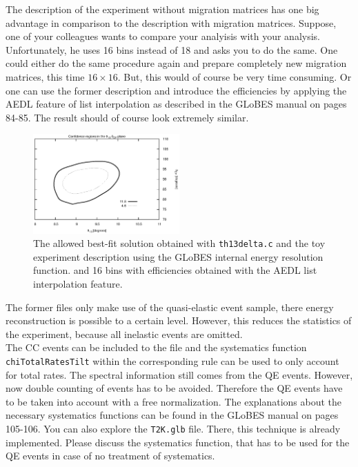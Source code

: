 \documentclass[12pt,a4paper]{article}
\newcommand{\aufg}[2]{\vspace{4mm}{\bf\underline{Problem #1:} {#2}} \vspace{3mm}}
\theoremstyle{dotless}
\begin{document}
The description of the experiment without migration matrices has one big advantage
in comparison to the description with migration matrices. Suppose, one of your colleagues
wants to compare your analyisis with your analysis. Unfortunately, he uses 16 bins instead of
18 and asks you to do the same. One could either do the same procedure again and prepare
completely new migration matrices, this time $16\times16$. But, this would of course be very
time consuming. Or one can use the former description and introduce the efficiencies 
by applying the AEDL feature of list interpolation as described in the GLoBES manual 
on pages 84-85. The result should of course look extremely similar.
%
\begin{figure}[h!]
  \begin{center}
    \includegraphics[width=0.5\textwidth]{Bins.eps}   
      \end{center}
  \vspace{-0.7 cm}
  \caption{\small The allowed best-fit solution obtained with {\tt th13delta.c}
  and the toy experiment description using the GLoBES internal energy resolution function.
  and 16 bins with efficiencies obtained with the AEDL list interpolation feature.}
  \label{fig:Bins}
\end{figure}


\aufg{6}{Usage of Total Rates}

The former files only make use of the quasi-elastic event sample, there energy
reconstruction is possible to a certain level. However, this reduces the statistics of the
experiment, because all inelastic events are omitted.\\

The CC events can be included to the file and the systematics function
{\tt chiTotalRatesTilt} within the corresponding rule can be used to only account for 
total rates. The spectral information still comes from the QE events. However, now double
counting of events has to be avoided. Therefore the QE events have to be taken into account
with a free normalization. The explanations about the necessary systematics functions can be found
in the GLoBES manual on pages 105-106. You can also explore the {\tt T2K.glb} file. There, this
technique is already implemented. Please discuss the systematics function, that has to be
used for the QE events in case of no treatment of systematics.
\end{document}
